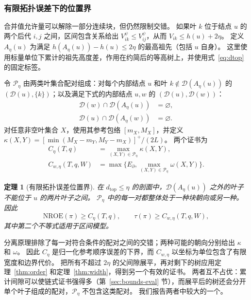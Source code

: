 \documentclass[fontset=none,zihao=5,a4paper]{ctexart}
\newtheorem{theorem}{定理}
\newcommand{\dtop}{d_{\mathrm{top}}}
\newcommand{\nroe}{\mathrm{NROE}}
\begin{document}
\subsubsection{有限拓扑误差下的位置界}
合并值允许量可以解除一部分连续块，但仍然限制交错。
如果叶 $k$ 位于结点 $u$ 的两个后代 $i,j$ 之间，区间包含关系给出 $V_{ik}^{\psi}\le V_{ij}^{\psi}$，从而 $V_{ik}\le h(u)+2\eta$。
定义 $A_\eta(u)$ 为满足 $h(A_\eta(u))-h(u)\le2\eta$ 的最高祖先（包括 $u$ 自身）。
这里使用标量单位下累计的祖先高度差，作用在约简后的等高树上，并使用式~\ref{eq:dtop} 的固定标签。

令 $\mathcal{P}_\eta$ 由两类叶集合配对组成：对每个内部结点 $u$ 和叶 $k\notin\mathcal{D}(A_\eta(u))$ 的 $(\mathcal{D}(u),\{k\})$；以及满足下式的内部结点 $u,w$ 的 $(\mathcal{D}(u),\mathcal{D}(w))$：
\begin{equation}\label{eq:separatedpairs}
\begin{aligned}
 \mathcal{D}(w)\cap\mathcal{D}(A_\eta(u))&=\varnothing,\\
 \mathcal{D}(u)\cap\mathcal{D}(A_\eta(w))&=\varnothing.
\end{aligned}
\end{equation}
对任意非空叶集合 $X$，使用其参考包络 $[m_X,M_X]$，并定义 $\kappa(X,Y)=[\min(M_X-m_Y,M_Y-m_X)]^+/(2L)$。
两个证书为
\begin{equation}\label{eq:chaindef}
\begin{aligned}
 C_\eta(T,q)&=\max_{(X,Y)\in\mathcal{P}_\eta}\kappa(X,Y),\\
 C_{w,\eta}(T,q,W)&=\max\{E_\partial,\max_{(X,Y)\in\mathcal{P}_\eta}\omega(X,Y)\}.
\end{aligned}
\end{equation}
\begin{theorem}[有限拓扑误差位置界]\label{thm:chain}
在 $\dtop\le\eta$ 的剖面中，$\mathcal{D}(A_\eta(u))$ 之外的叶子不能位于 $u$ 的两片叶子之间。
$\mathcal{P}_\eta$ 中的每一对都整体处于一种块朝向或另一种。
因此
\begin{equation}\label{eq:chainbounds}
 \nroe(\pi)\ge C_\eta(T,q),\qquad
 \tau(\pi)\ge C_{w,\eta}(T,q,W),
\end{equation}
其中第二个不等式适用于区间模型。
\end{theorem}
分离原理排除了每一对符合条件的配对之间的交错；两种可能的朝向分别给出 $\kappa$ 和 $\omega$。
因此 $C_\eta$ 是归一化参考顺序误差的下界，而 $C_{w,\eta}$ 以坐标为单位包含了有限宽度和边界代价。
把所有不超过 $2\eta$ 的父间隙展平，再对剩下的树应用定理~\ref{thm:order} 和定理~\ref{thm:width}，得到另一个有效的证书。
两者互不占优：累计间隙可以使链式证书强得多（第~\ref{sec:bounds-eval} 节），而展平后的树还会分开单个叶子组成的配对，$\mathcal{P}_\eta$ 不包含这类配对。
我们报告两者中较大的一个。
\end{document}
